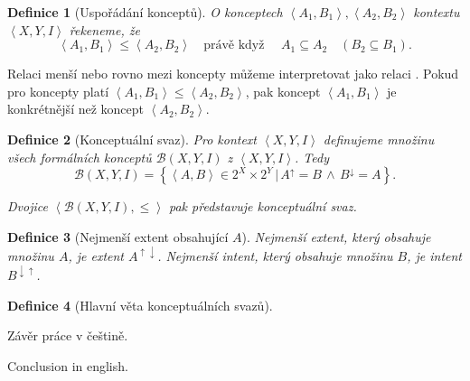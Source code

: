 \documentclass[12pt]{article}
\newcommand{\sep}{\,|\,}
\newcommand{\pravekdyz}{\mbox{právě když }}
\newcommand{\adds}[1]{\left\{#1\right\}}
\newcommand{\addsp}[1]{\left<#1\right>}
\newcommand{\logand}{\,\wedge\,}
\newcommand{\context}{\addsp{X, Y, I}}
\newcommand{\lattice}{\mathcal{B}(X, Y, I)}
\newcommand{\up}{^{\uparrow}}
\newcommand{\down}{^{\downarrow}}
\newcommand{\updown}{^{\uparrow\downarrow}}
\newcommand{\downup}{^{\downarrow\uparrow}}
\newtheorem{mydef}{Definice}
\begin{document}
\begin{mydef}[Uspořádání konceptů]
\label{def.order}
O konceptech $\addsp{A_1, B_1}, \addsp{A_2, B_2}$ kontextu $\context$ řekeneme, že
$$\addsp{A_1, B_1}\le\addsp{A_2, B_2}\quad\pravekdyz\quad A_1\subseteq A_2 \quad(B_2\subseteq B_1).$$
\end{mydef}

Relaci menší nebo rovno mezi koncepty můžeme interpretovat jako relaci . Pokud pro koncepty platí $\addsp{A_1, B_1}\le\addsp{A_2, B_2}$, pak koncept $\addsp{A_1, B_1}$ je konkrétnější než koncept $\addsp{A_2, B_2}$. 

\begin{mydef}[Konceptuální svaz]
Pro kontext $\context$ definujeme množinu všech formálních konceptů $\lattice$ z $\context$. Tedy
$$\lattice=\adds{\addsp{A, B}\in 2^X\times 2^Y\sep A\up=B\logand B\down=A}.$$

Dvojice $\addsp{\lattice, \le}$ pak představuje konceptuální svaz. 
\end{mydef}

\begin{mydef}[Nejmenší extent obsahující $A$]
Nejmenší extent, který obsahuje množinu $A$, je extent $A\updown$. Nejmenší intent, který obsahuje množinu $B$, je intent $B\downup$. 
\end{mydef}

\begin{mydef}[Hlavní věta konceptuálních svazů]

\end{mydef}

\begin{conclusions-cz}
  Závěr práce v češtině.
\end{conclusions-cz}


\begin{conclusions-en}
  Conclusion in english.
\end{conclusions-en}
\end{document}
